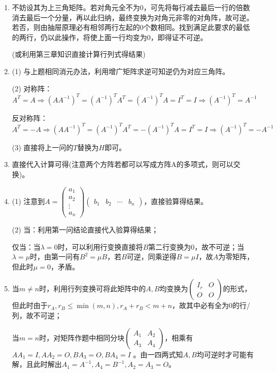 \documentclass[a4paper,UTF8,fontset=windows]{ctexart}
\begin{document}
\begin{enumerate}
(7) 作列变换可使第一列为0，故不可逆。

(8) 作列变换可使第一列为0，故不可逆。

\item
不妨设其为上三角矩阵。若对角元全不为0，可先将每行减去最后一行的倍数消去最后一个分量，再以此归纳，最终变换为对角元非零的对角阵，故可逆。若否，则由抽屉原理必有相邻两行左起的0个数相同。找到满足此要求的最低的两行，仍以此操作，将使上面一行均变为0，即得证不可逆。

(或利用第三章知识直接计算行列式得结果)

\item
(1) 与上题相同消元办法，利用增广矩阵求逆可知逆仍为对应三角阵。

(2) 对称阵：$A^T=A\Rightarrow(AA^{-1})^T=(A^{-1})^TA^T=(A^{-1})^TA=I^T=I\Rightarrow(A^{-1})^T=A^{-1}$

反对称阵：$A^T=-A\Rightarrow(AA^{-1})^T=(A^{-1})^TA^T=-(A^{-1})^TA=I^T=I\Rightarrow(A^{-1})^T=-A^{-1}$

(3) 直接将上一问的$T$替换为$H$即可。

\item
直接代入计算可得(注意两个方阵若都可以写成方阵A的多项式，则可以交换)。

\item
(1) 注意到$A=\begin{pmatrix}a_1\\a_2\\\vdots\\a_n\end{pmatrix}\begin{pmatrix}b_1&b_2&\cdots&b_n\end{pmatrix}$，直接验算得结果。

(2) 当：利用第一问结论直接代入验算得结果；

仅当：当$\lambda=0$时，可以利用行变换直接将$B$第二行变换为0，故不可逆；当$\lambda=\mu$时，由第一问有$B^2=\mu B$，若$B$可逆，同乘逆得$B=\mu I$，故$A$为零矩阵，但此时$\mu=0$，矛盾。

\item
当$m\ne n$时，利用行列变换可将此矩阵中的$A,B$均变换为$\begin{pmatrix}I_r&O\\O&O\end{pmatrix}$的形式，但此时由于$r_A,r_B\le\min(m,n), r_A+r_B<m+n$，故其中必有全为0的行/列，故不可逆；

当$m=n$时，对矩阵作题中相同分块$\begin{pmatrix}A_1&A_2\\A_3&A_4\end{pmatrix}$，相乘有
$AA_1=I,AA_2=O,BA_3=O,BA_4=I$
。由一四两式知$A,B$均可逆时才可能有解，且此时解出$A_1=A^{-1},A_4=B^{-1},A_2=A_3=O$。


\end{enumerate}
\end{document}
